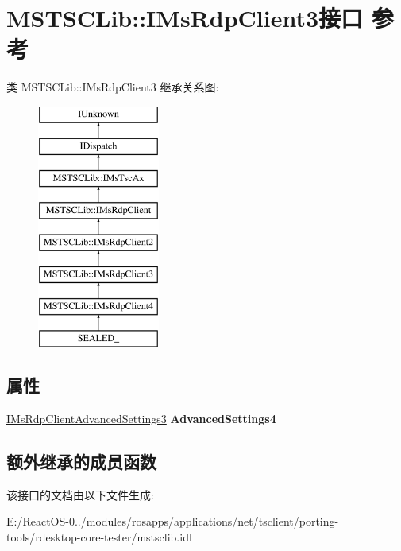 \hypertarget{interface_m_s_t_s_c_lib_1_1_i_ms_rdp_client3}{}\section{M\+S\+T\+S\+C\+Lib\+:\+:I\+Ms\+Rdp\+Client3接口 参考}
\label{interface_m_s_t_s_c_lib_1_1_i_ms_rdp_client3}
类 M\+S\+T\+S\+C\+Lib\+:\+:I\+Ms\+Rdp\+Client3 继承关系图\+:\begin{figure}[H]
\begin{center}
\leavevmode
\includegraphics[height=8.000000cm]{interface_m_s_t_s_c_lib_1_1_i_ms_rdp_client3}
\end{center}
\end{figure}
\subsection*{属性}
\begin{DoxyCompactItemize}
\item 
\mbox{\label{interface_m_s_t_s_c_lib_1_1_i_ms_rdp_client3_a03b3673cdd392a06742a24bd1cecfc14}} 
\hyperlink{interface_m_s_t_s_c_lib_1_1_i_ms_rdp_client_advanced_settings3}{I\+Ms\+Rdp\+Client\+Advanced\+Settings3} {\bfseries Advanced\+Settings4}
\end{DoxyCompactItemize}
\subsection*{额外继承的成员函数}


该接口的文档由以下文件生成\+:\begin{DoxyCompactItemize}
\item 
E\+:/\+React\+O\+S-\/0../modules/rosapps/applications/net/tsclient/porting-\/tools/rdesktop-\/core-\/tester/mstsclib.\+idl\end{DoxyCompactItemize}
